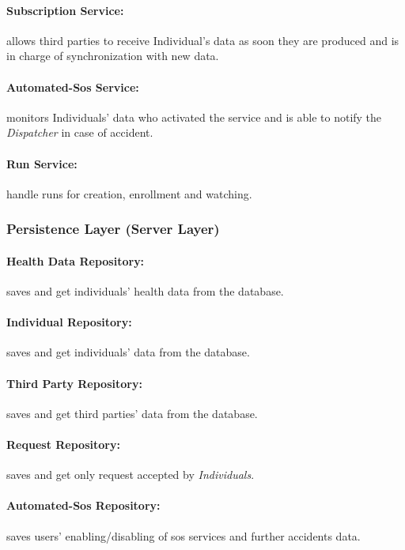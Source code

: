 \documentclass[a4paper]{article}
\begin{document}
    \paragraph{Subscription Service:}
    allows third parties to receive Individual's data as soon they are produced and is in charge of synchronization with new data.
    
    \paragraph{Automated-Sos Service:}
    monitors Individuals' data who activated the service and is able to notify the \textit{Dispatcher} in case of accident.
    
    \paragraph{Run Service:}
    handle runs for creation, enrollment and watching.
    
    \subsubsection{Persistence Layer (Server Layer)}
        
    \paragraph{Health Data Repository:}
    saves and get individuals' health data from the database.
    
    \paragraph{Individual Repository:}
    saves and get individuals' data from the database.
    
    \paragraph{Third Party Repository:}
    saves and get third parties' data from the database.
    
    \paragraph{Request Repository:}
    saves and get only request accepted by \textit{Individuals}.
    
    \paragraph{Automated-Sos Repository:}
    saves users' enabling/disabling of sos services and further accidents data.
    
\end{document}
